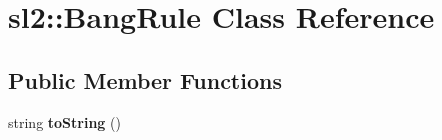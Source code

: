 \hypertarget{classsl2_1_1_bang_rule}{}\section{sl2\+:\+:Bang\+Rule Class Reference}
\label{classsl2_1_1_bang_rule}
\subsection*{Public Member Functions}
\begin{DoxyCompactItemize}
\item 
\mbox{\label{classsl2_1_1_bang_rule_aa9d407aac583c7fb99bd8f65c89771e8}} 
string {\bfseries to\+String} ()
\end{DoxyCompactItemize}
